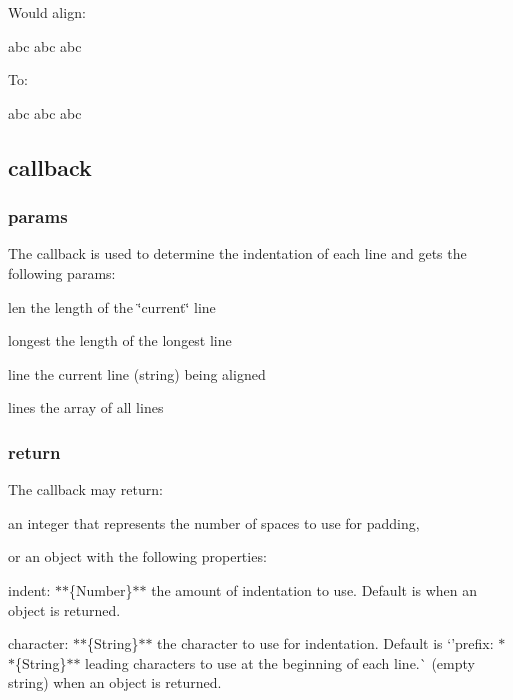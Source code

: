 Would align\+:


\begin{DoxyCode}
abc
abc
abc
\end{DoxyCode}


To\+:


\begin{DoxyCode}
abc
abc
abc
\end{DoxyCode}


\subsection*{callback}

\subsubsection*{params}

The callback is used to determine the indentation of each line and gets the following params\+:


\begin{DoxyItemize}
\item {\ttfamily len} the length of the \char`\"{}current\char`\"{} line
\item {\ttfamily longest} the length of the longest line
\item {\ttfamily line} the current line (string) being aligned
\item {\ttfamily lines} the array of all lines
\end{DoxyItemize}

\subsubsection*{return}

The callback may return\+:


\begin{DoxyItemize}
\item an integer that represents the number of spaces to use for padding,
\item or an object with the following properties\+:
\begin{DoxyItemize}
\item {\ttfamily indent}\+: $\ast$$\ast$\{Number\}$\ast$$\ast$ the amount of indentation to use. Default is {} when an object is returned.
\item {\ttfamily character}\+: $\ast$$\ast$\{String\}$\ast$$\ast$ the character to use for indentation. Default is `'prefix{\ttfamily \+: $\ast$$\ast$\{String\}$\ast$$\ast$ leading characters to use at the beginning of each line.}\textquotesingle{}\textquotesingle{}\`{} (empty string) when an object is returned.
\end{DoxyItemize}
\end{DoxyItemize}

